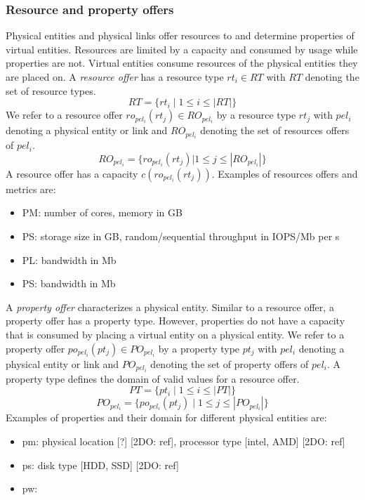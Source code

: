 \documentclass[conference]{IEEEtran}
\begin{document}
\subsubsection{Resource and property offers}

Physical entities and physical links offer resources to and determine properties of virtual entities. Resources are limited by a capacity and consumed by usage while properties are not. Virtual entities consume resources of the physical entities they are placed on. A \textit{resource offer} has a resource type $rt_i \in RT$ with $RT$ denoting the set of resource types. 
\begin{equation}
RT = \{ rt_i \mid 1 \leq i \leq \left\vert RT \right\vert \}
\end{equation}
We refer to a resource offer $ro_{pel_i}(rt_j) \in RO_{pel_i}$ by a resource type $rt_j$ with $pel_i$ denoting a physical entity or link and $RO_{pel_i}$ denoting the set of resources offers of $pel_i$.
\begin{equation}
RO_{pel_i} = \{ ro_{pel_i}(rt_j) | 1 \leq j \leq \left\vert RO_{pel_i} \right\vert \}
\end{equation}
A resource offer has a capacity $c(ro_{pel_i}(rt_j))$. Examples of resources offers and metrics are:
\begin{itemize}
	\item PM: number of cores, memory in GB
	\item PS: storage size in GB, random/sequential throughput in IOPS/Mb per s
	\item PL: bandwidth in Mb
	\item PS: bandwidth in Mb
\end{itemize} 

A \textit{property offer} characterizes a physical entity. Similar to a resource offer, a property offer has a property type. However, properties do not have a capacity that is consumed by placing a virtual entity on a physical entity. 
We refer to a property offer $po_{pel_i}(pt_j) \in PO_{pel_i}$ by a property type $pt_j$ with $pel_i$ denoting a physical entity or link and $PO_{pel_i}$ denoting the set of property offers of $pel_i$. A property type defines the domain of valid values for a resource offer.
\begin{equation}
PT = \{ pt_i \mid 1 \leq i \leq \left\vert PT \right\vert \}
\end{equation}
\begin{equation}
PO_{pel_i} = \{ po_{pel_i}(pt_j) \mid 1 \leq j \leq \left\vert PO_{pel_i} \right\vert \}
\end{equation}
Examples of properties and their domain for different physical entities are:
\begin{itemize}
	\item pm: physical location [?] [2DO: ref], processor type [intel, AMD] [2DO: ref]
	\item ps: disk type [HDD, SSD] [2DO: ref]
	\item pw: 
\end{itemize} 
\end{document}
